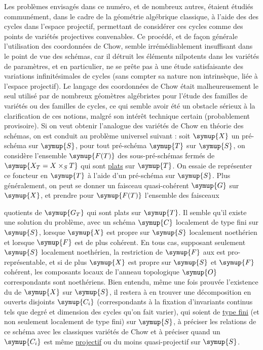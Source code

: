  Les problèmes envisagés dans ce numéro, et de nombreux
autres, étaient étudiés communément, dans le cadre de la géométrie algébrique
classique, à l'aide des  des cycles dans l'espace
projectif, permettant de considérer ces cycles comme des points de variétés
projectives convenables. Ce procédé, et de façon générale l'utilisation des
coordonnées de Chow, semble irrémédiablement insuffisant dans le point de vue
des schémas, car il détruit les éléments nilpotents dans les variétés de
paramètres, et en particulier, ne se prête pas à une étude satisfaisante des
variations infinitésimales de cycles (sans compter sa nature non intrinsèque,
liée à l'espace projectif). Le langage des coordonnées de Chow était
malheureusement le seul utilisé par de nombreux géomètres algébristes pour
l'étude des familles de variétés ou des familles de cycles, ce qui semble
avoir été un obstacle sérieux à la clarification de ces notions, malgré son
intérêt technique certain (probablement provisoire). Si on veut obtenir
l'analogue des variétés de Chow en théorie des schémas, on est conduit au
problème universel suivant : soit $\symup{X}$ un pré-schéma sur $\symup{S}$, pour tout
pré-schéma $\symup{T}$ sur $\symup{S}$, on considère l'ensemble $\symup{F(T)}$ des sous-pré-schémas
fermés de $\symup{X_T=X\times_ST}$ qui sont \uline{plats} sur $\symup{T}$. On essaie de représenter ce
foncteur en $\symup{T}$ à l'aide d'un pré-schéma sur $\symup{S}$. Plus généralement, on peut se
donner un faisceau quasi-cohérent $\symup{G}$ sur $\symup{X}$, et prendre pour $\symup{F(T)}$
l'ensemble des faisceaux

quotients de $\symup{G_T}$ qui sont plats sur $\symup{T}$. Il semble qu'il existe une solution
du problème, avec un schéma $\symup{C}$ localement de type fini sur $\symup{S}$, lorsque $\symup{X}$
est propre sur $\symup{S}$ localement noethérien et lorsque $\symup{F}$ est de plus cohérent.
En tous cas, supposant seulement $\symup{S}$ localement noethérien, la restriction de
$\symup{F}$ aux  est pro-représentable, et si de plus $\symup{X}$
est propre sur $\symup{S}$ et $\symup{F}$ cohérent, les composants locaux de l'anneau
topologique $\symup{O}$ correspondants sont noethériens. Bien entendu, même une fois
prouvée l'existence du  de $\symup{X}$ sur $\symup{S}$, il restera à en
trouver une décomposition en ouverts disjoints $\symup{C_i}$ (correspondants à la
fixation d'invariants continus tels que degré et dimension des cycles qu'on
fait varier), qui soient de \uline{type fini} (et non seulement localement de type
fini) sur $\symup{S}$, à préciser les relations de ce schéma avec les classiques
variétés de Chow et à préciser quand un $\symup{C_i}$ est même \uline{projectif} ou du moins
quasi-projectif sur $\symup{S}$.

